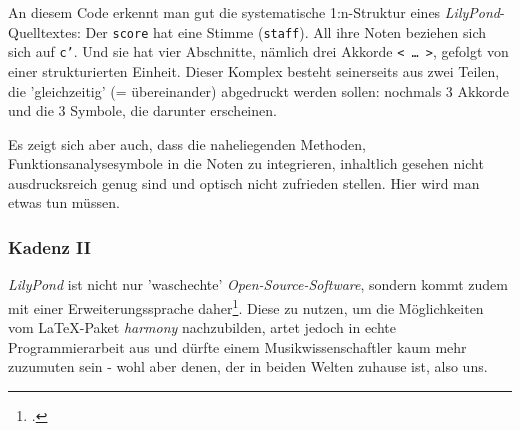 An diesem Code erkennt man gut die systematische 1:n-Struktur eines
\textit{LilyPond}-Quelltextes: Der \texttt{score} hat eine Stimme
(\texttt{staff}). All ihre Noten beziehen sich sich auf \texttt{c'}. Und sie hat
vier Abschnitte, nämlich drei Akkorde \texttt{< \ldots\ >}, gefolgt von einer
strukturierten Einheit. Dieser Komplex besteht seinerseits aus zwei Teilen, die
'gleichzeitig' (= übereinander) abgedruckt werden sollen: nochmals 3 Akkorde und
die 3 Symbole, die darunter erscheinen.

Es zeigt sich aber auch, dass die naheliegenden Methoden,
Funktionsanalysesymbole in die Noten zu integrieren, inhaltlich gesehen nicht
ausdrucksreich genug sind und optisch nicht zufrieden stellen. Hier wird man
etwas tun müssen. 

\subsubsection{Kadenz II}

\textit{LilyPond} ist nicht nur 'waschechte' \textit{Open-Source-Software}, sondern
kommt zudem mit einer Erweiterungssprache daher\footcite[vgl. dazu][\nopage
wp]{WpedGuile2019a}. Diese zu nutzen, um die Möglichkeiten vom \LaTeX-Paket
\textit{harmony} nachzubilden, artet jedoch in echte Programmierarbeit aus und
dürfte einem Musikwissenschaftler kaum mehr zuzumuten sein - wohl aber denen,
der in beiden Welten zuhause ist, also uns.

